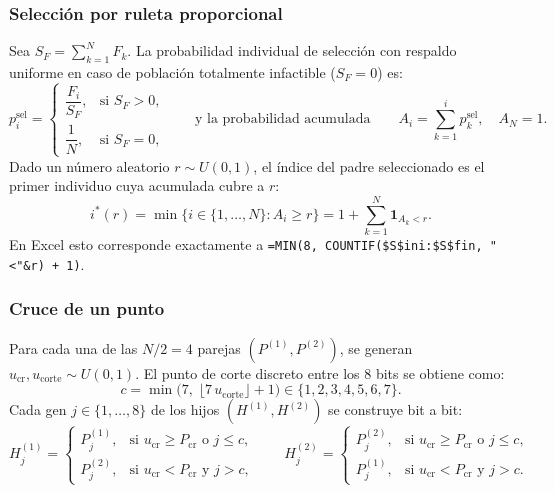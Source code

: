 \documentclass[11pt,a4paper]{article}
\begin{document}
\subsubsection{Selecci\'on por ruleta proporcional}
Sea $S_F = \sum_{k=1}^{N} F_k$. La probabilidad individual de selecci\'on con respaldo uniforme en caso de poblaci\'on totalmente infactible ($S_F = 0$) es:
\begin{equation}
p^{\text{sel}}_i = \begin{cases}
\dfrac{F_i}{S_F}, & \text{si } S_F > 0, \\[8pt]
\dfrac{1}{N}, & \text{si } S_F = 0,
\end{cases}
\qquad\text{y la probabilidad acumulada}\qquad
A_i = \sum_{k=1}^{i} p^{\text{sel}}_k, \quad A_N = 1.
\end{equation}
Dado un n\'umero aleatorio $r \sim U(0,1)$, el \'indice del padre seleccionado es el primer individuo cuya acumulada cubre a $r$:
\begin{equation}
i^*(r) = \min\{i \in \{1,\dots,N\} : A_i \ge r\} = 1 + \sum_{k=1}^{N} \mathbf{1}_{A_k < r}.
\end{equation}
En Excel esto corresponde exactamente a \texttt{=MIN(8, COUNTIF(\$S\$ini:\$S\$fin, "<"\&r) + 1)}.

\subsubsection{Cruce de un punto}
Para cada una de las $N/2 = 4$ parejas $(P^{(1)}, P^{(2)})$, se generan $u_{\text{cr}}, u_{\text{corte}} \sim U(0,1)$. El punto de corte discreto entre los 8 bits se obtiene como:
\begin{equation}
c = \min\!\big(7,\; \lfloor 7\,u_{\text{corte}} \rfloor + 1\big) \in \{1, 2, 3, 4, 5, 6, 7\}.
\end{equation}
Cada gen $j \in \{1,\dots,8\}$ de los hijos $(H^{(1)}, H^{(2)})$ se construye bit a bit:
\begin{equation}
H^{(1)}_j = \begin{cases}
P^{(1)}_j, & \text{si } u_{\text{cr}} \ge P_{\text{cr}} \text{ o } j \le c, \\
P^{(2)}_j, & \text{si } u_{\text{cr}} < P_{\text{cr}} \text{ y } j > c,
\end{cases}
\qquad
H^{(2)}_j = \begin{cases}
P^{(2)}_j, & \text{si } u_{\text{cr}} \ge P_{\text{cr}} \text{ o } j \le c, \\
P^{(1)}_j, & \text{si } u_{\text{cr}} < P_{\text{cr}} \text{ y } j > c.
\end{cases}
\end{equation}
\end{document}
